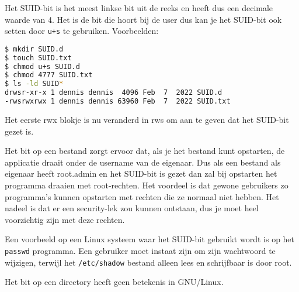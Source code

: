 Het SUID-bit is het meest linkse bit uit de reeks en heeft dus een decimale waarde van 4. Het is de bit die hoort bij de user dus kan je het SUID-bit ook setten door \texttt{u+s} te gebruiken. Voorbeelden:
\begin{lstlisting}[language=bash]
$ mkdir SUID.d
$ touch SUID.txt
$ chmod u+s SUID.d
$ chmod 4777 SUID.txt
$ ls -ld SUID*
drwsr-xr-x 1 dennis dennis  4096 Feb  7  2022 SUID.d
-rwsrwxrwx 1 dennis dennis 63960 Feb  7  2022 SUID.txt
\end{lstlisting}
Het eerste rwx blokje is nu veranderd in rws om aan te geven dat het SUID-bit gezet is.

Het bit op een bestand zorgt ervoor dat, als je het bestand kunt opstarten, de applicatie draait onder de username van de eigenaar. Dus als een bestand als eigenaar heeft root.admin en het SUID-bit is gezet dan zal bij opstarten het programma draaien met root-rechten. Het voordeel is dat gewone gebruikers zo programma's kunnen opstarten met rechten die ze normaal niet hebben. Het nadeel is dat er een security-lek zou kunnen ontstaan, dus je moet heel voorzichtig zijn met deze rechten.

Een voorbeeld op een Linux systeem waar het SUID-bit gebruikt wordt is op het \texttt{passwd} programma. Een gebruiker moet instaat zijn om zijn wachtwoord te wijzigen, terwijl het \texttt{/etc/shadow} bestand alleen lees en schrijfbaar is door root.

Het bit op een directory heeft geen betekenis in GNU/Linux.

